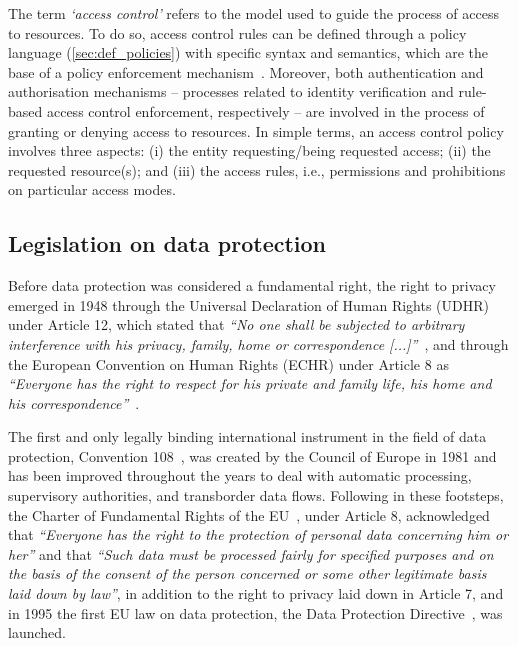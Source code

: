The term \textit{`access control'} refers to the model used to guide the process of access to resources.
To do so, access control rules can be defined through a policy language (\ref{sec:def_policies}) with specific syntax and semantics, which are the base of a policy enforcement mechanism~\citep{cuenca_grau_access_2017}. 
Moreover, both authentication and authorisation mechanisms -- processes related to identity verification and rule-based access control enforcement, respectively -- are involved in the process of granting or denying access to resources.
In simple terms, an access control policy involves three aspects:
(i) the entity requesting/being requested access;
(ii) the requested resource(s); and 
(iii) the access rules, i.e., permissions and prohibitions on particular access modes.

\subsection{Legislation on data protection}
\label{sec:def_data_protection_law}

Before data protection was considered a fundamental right, the right to privacy emerged in 1948 through the Universal Declaration of Human Rights (UDHR) under Article 12, which stated that \textit{``No one shall be subjected to arbitrary interference with his privacy, family, home or correspondence [...]''}~\citep{united_nations_general_assembly_universal_1948}, and through the European Convention on Human Rights (ECHR) under Article 8 as \textit{``Everyone has the right to respect for his private and family life, his home and his correspondence''}~\citep{council_of_europe_european_1950}.

The first and only legally binding international instrument in the field of data protection, Convention 108~\citep{council_of_europe_convention_1981}, was created by the Council of Europe in 1981 and has been improved throughout the years to deal with automatic processing, supervisory authorities, and transborder data flows.
Following in these footsteps, the Charter of Fundamental Rights of the EU~\citeyearpar{noauthor_charter_2000}, under Article 8, acknowledged that \textit{``Everyone has the right to the protection of personal data concerning him or her''} and that \textit{``Such data must be processed fairly for specified purposes and on the basis of the consent of the person concerned or some other legitimate basis laid down by law''}, in addition to the right to privacy laid down in Article 7, and in 1995 the first EU law on data protection, the Data Protection Directive~\citeyearpar{noauthor_directive_1995}, was launched.

